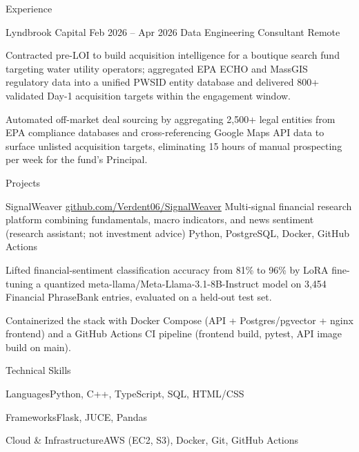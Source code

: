 \documentclass[
	11pt
]{../../../template}
\begin{document}
\begin{rSection}{E}{xperience}
		\begin{rSectionEntry}
			{Lyndbrook Capital}
			{Feb 2026 -- Apr 2026}
			{Data Engineering Consultant}
			{}
			{Remote}

			\item Contracted pre-LOI to build acquisition intelligence for a boutique search fund targeting water utility operators; aggregated EPA ECHO and MassGIS regulatory data into a unified PWSID entity database and delivered 800+ validated Day-1 acquisition targets within the engagement window.
			\item Automated off-market deal sourcing by aggregating 2,500+ legal entities from EPA compliance databases and cross-referencing Google Maps API data to surface unlisted acquisition targets, eliminating 15 hours of manual prospecting per week for the fund's Principal.
		\end{rSectionEntry}

	\end{rSection}

	\begin{rSection}{P}{rojects}
		\begin{rSectionEntry}
			{SignalWeaver}
			{\href{https://github.com/Verdent06/SignalWeaver}{github.com/Verdent06/SignalWeaver}}
			{Multi-signal financial research platform combining fundamentals, macro indicators, and news sentiment (research assistant; not investment advice)}
			{Python, PostgreSQL, Docker, GitHub Actions}
			{}

			\item Lifted financial-sentiment classification accuracy from 81\% to 96\% by LoRA fine-tuning a quantized meta-llama/Meta-Llama-3.1-8B-Instruct model on 3,454 Financial PhraseBank entries, evaluated on a held-out test set.
			\item Containerized the stack with Docker Compose (API + Postgres/pgvector + nginx frontend) and a GitHub Actions CI pipeline (frontend build, pytest, API image build on main).
		\end{rSectionEntry}
	\end{rSection}

	\begin{rSection}{T}{echnical Skills}
		\begin{rSet}{Languages}{Python, C++, TypeScript, SQL, HTML/CSS}
		\end{rSet}
		\begin{rSet}{Frameworks}{Flask, JUCE, Pandas}
		\end{rSet}
		\begin{rSet}{Cloud \& Infrastructure}{AWS (EC2, S3), Docker, Git, GitHub Actions}
		\end{rSet}
	\end{rSection}
\end{document}
